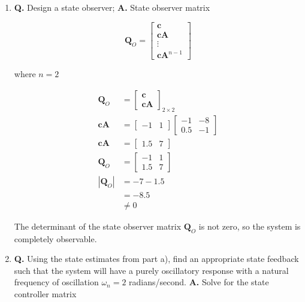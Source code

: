 \documentclass[main.tex]{subfiles}
\begin{document}
\begin{enumerate}
	\begin{enumerate}
	    \item \textbf{Q.} Design a state observer; \textbf{A.} State observer matrix

        $$
        \textbf{Q}_O=\left[\begin{array}{c}
        \textbf{c} \\
        \textbf{c} \textbf{A} \\
        \vdots \\
        \textbf{c} \textbf{A}^{n-1}
        \end{array}\right]
        $$

        where $n=2$

        $$
        \begin{aligned}
        \textbf{Q}_O & = \left[\begin{array}{l}
        \textbf{c} \\
        \textbf{c} \textbf{A}
        \end{array}\right]_{2 \times 2} \\
        \textbf{c} \textbf{A} &= \left[\begin{array}{ll}
        -1 & 1
        \end{array}\right]\left[\begin{array}{ll}
        -1 & -8 \\
        0.5 & -1
        \end{array}\right] \\
        \textbf{c} \textbf{A} &= \left[\begin{array}{ll}
        1.5 & 7
        \end{array}\right] \\
        \textbf{Q}_O &= \left[\begin{array}{ll}
        -1 & 1 \\
        1.5 & 7
        \end{array}\right] \\ 
        |\textbf{Q}_O| &= -7 - 1.5 \\
        & = - 8.5 \\
        & \neq 0
        \end{aligned}
        $$

        The determinant of the state observer matrix $\textbf{Q}_O$ is not zero, so the system is completely observable. 
     
	    \item \textbf{Q.} Using the state estimates from part a), find an appropriate state feedback such that the system will have a purely oscillatory response with a natural frequency of oscillation $\omega_n = 2$ radians/second. \textbf{A.} Solve for the state controller matrix


\end{enumerate}
\end{enumerate}
\end{document}
